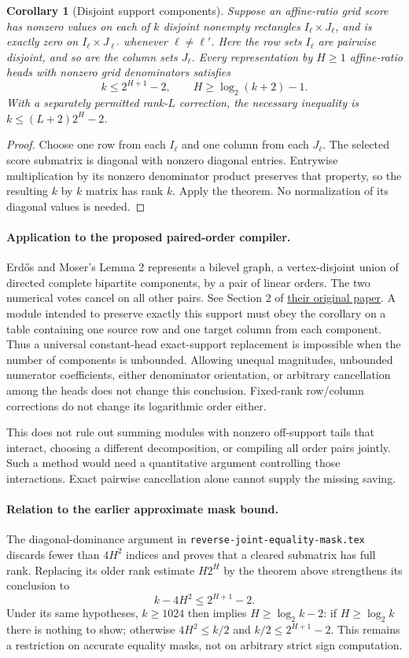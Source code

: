 \documentclass[11pt]{article}
\newtheorem{corollary}{Corollary}
\begin{document}
\begin{corollary}[Disjoint support components]
Suppose an affine-ratio grid score has nonzero values on each of $k$
disjoint nonempty rectangles $I_\ell\times J_\ell$, and is exactly zero
on $I_\ell\times J_{\ell'}$ whenever $\ell\ne\ell'$. Here the row sets
$I_\ell$ are pairwise disjoint, and so are the column sets $J_\ell$.
Every representation by $H\geq1$ affine-ratio heads with nonzero grid
denominators satisfies
\[
 k\leq2^{H+1}-2,\qquad H\geq\log_2(k+2)-1.
\]
With a separately permitted rank-$L$ correction, the necessary inequality
is $k\leq(L+2)2^H-2$.
\end{corollary}
\begin{proof}
Choose one row from each $I_\ell$ and one column from each $J_\ell$.
The selected score submatrix is diagonal with nonzero diagonal entries.
Entrywise multiplication by its nonzero denominator product preserves
that property, so the resulting $k$ by $k$ matrix has rank $k$.
Apply the theorem. No normalization of its diagonal values is needed.
\end{proof}

\paragraph{Application to the proposed paired-order compiler.}
Erd\H{o}s and Moser's Lemma 2 represents a bilevel graph, a vertex-disjoint
union of directed complete bipartite components, by a pair of linear
orders. The two numerical votes cancel on all other pairs.
See Section 2 of
\href{https://www.renyi.hu/~p_erdos/1964-22.pdf}{their original paper}.
A module intended to preserve exactly this support must obey the
corollary on a table containing one source row and one target column
from each component. Thus a universal constant-head exact-support
replacement is impossible when the number of components is unbounded.
Allowing unequal magnitudes, unbounded numerator coefficients, either
denominator orientation, or arbitrary cancellation among the heads
does not change this conclusion. Fixed-rank row/column corrections do
not change its logarithmic order either.

This does not rule out summing modules with nonzero off-support tails
that interact, choosing a different decomposition, or compiling all
order pairs jointly. Such a method would need a quantitative argument
controlling those interactions. Exact pairwise cancellation alone
cannot supply the missing saving.

\paragraph{Relation to the earlier approximate mask bound.}
The diagonal-dominance argument in
\texttt{reverse-joint-equality-mask.tex} discards fewer than $4H^2$
indices and proves that a cleared submatrix has full rank. Replacing
its older rank estimate $H2^H$ by the theorem above strengthens its
conclusion to
\[
 k-4H^2\leq2^{H+1}-2.
\]
Under its same hypotheses, $k\geq1024$ then implies
$H\geq\log_2k-2$: if $H\geq\log_2k$ there is nothing to show;
otherwise $4H^2\leq k/2$ and $k/2\leq2^{H+1}-2$.
This remains a restriction on accurate equality masks, not on arbitrary
strict sign computation.
\end{document}
